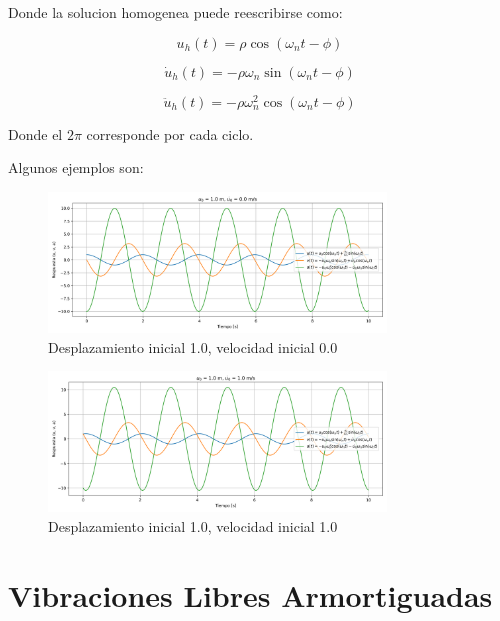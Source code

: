 \documentclass{article}  %
\begin{document}
Donde la solucion homogenea puede reescribirse como:

\begin{equation}
    u_h(t) = \rho \cos(\omega_n t - \phi) 
\end{equation}

\begin{equation}
    \dot{u}_h(t) = -\rho \omega_n \sin(\omega_n t - \phi)
\end{equation}

\begin{equation}
    \ddot{u}_h(t) = -\rho \omega_n^2 \cos(\omega_n t - \phi)
\end{equation}

Donde el $2\pi$ corresponde por cada ciclo.

Algunos ejemplos son:

\begin{figure}[H]
    \centering
    \includegraphics[width=0.8\textwidth]{GRAFICOS/sis_no_amortiguado_u0_1.0_v0_0.0.png}
    \caption{Desplazamiento inicial 1.0, velocidad inicial 0.0}
    \label{fig:ejemplo1}
\end{figure}

\begin{figure}[H]
    \centering
    \includegraphics[width=0.8\textwidth]{GRAFICOS/sis_no_amortiguado_u0_1.0_v0_1.0.png}
    \caption{Desplazamiento inicial 1.0, velocidad inicial 1.0}
    \label{fig:ejemplo1}
\end{figure}


\newpage
\section{Vibraciones Libres Armortiguadas}
\end{document}
